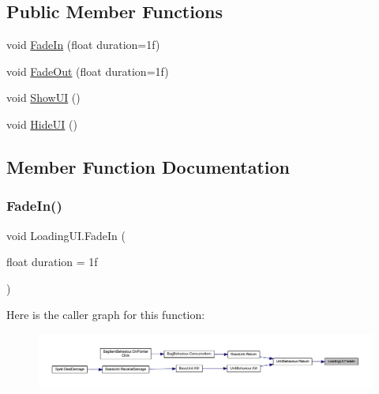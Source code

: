 \subsection*{Public Member Functions}
\begin{DoxyCompactItemize}
\item 
void \mbox{\hyperlink{class_loading_u_i_ada368f60f70e94bc04f0cbf47455306a}{Fade\+In}} (float duration=1f)
\item 
void \mbox{\hyperlink{class_loading_u_i_adaafb58a5d49b940e039bd307a67b2c9}{Fade\+Out}} (float duration=1f)
\item 
void \mbox{\hyperlink{class_loading_u_i_a117b66becd8ec50738d5bb53395c5638}{Show\+UI}} ()
\item 
void \mbox{\hyperlink{class_loading_u_i_a4b195dd7d9b45cbe16506f67e2d8bf10}{Hide\+UI}} ()
\end{DoxyCompactItemize}


\subsection{Member Function Documentation}
\mbox{\label{class_loading_u_i_ada368f60f70e94bc04f0cbf47455306a}} 
\subsubsection{\texorpdfstring{FadeIn()}{FadeIn()}}
{\footnotesize\ttfamily void Loading\+U\+I.\+Fade\+In (\begin{DoxyParamCaption}\item[{float}]{duration = {\ttfamily 1f} }\end{DoxyParamCaption})}

Here is the caller graph for this function\+:
\nopagebreak
\begin{figure}[H]
\begin{center}
\leavevmode
\includegraphics[width=350pt]{class_loading_u_i_ada368f60f70e94bc04f0cbf47455306a_icgraph}
\end{center}
\end{figure}
\mbox{\label{class_loading_u_i_adaafb58a5d49b940e039bd307a67b2c9}} 
